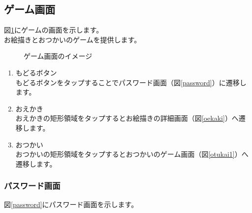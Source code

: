 \documentclass[a4j]{jarticle}
\begin{document}
\subsection{ゲーム画面}
図\ref{game}にゲームの画面を示します。\\
お絵描きとおつかいのゲームを提供します。

\begin{figure}[H]
    \begin{center}
    \caption {ゲーム画面のイメージ}
    \label{game}
    \end{center}
\end{figure}

\begin{enumerate}
  \renewcommand{\labelenumi}{\textcircled{\scriptsize \theenumi}}
\item もどるボタン\\
  もどるボタンをタップすることでパスワード画面（図\ref{password}）に遷移します。
\item おえかき\\
  おえかきの矩形領域をタップするとお絵描きの詳細画面（図\ref{oekaki}）へ遷移します。
\item おつかい\\
  おつかいの矩形領域をタップするとおつかいのゲーム画面（図\ref{otukai1}）へ遷移します。
\end{enumerate}

\newpage
\subsubsection{パスワード画面}
図\ref{password}にパスワード画面を示します。\\
\end{document}
